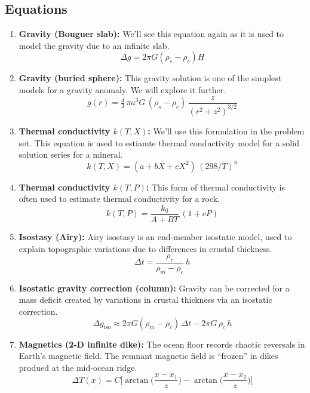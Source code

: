 \documentclass[11pt,a4paper]{article}
\begin{document}
\subsection*{Equations}
\begin{enumerate}[label=Q\arabic*.,itemsep=6pt]
  \item \textbf{Gravity (Bouguer slab):}
  We'll see this equation again as it is used to model the gravity due to an infinite slab.
  \[
    \Delta g = 2\pi G(\rho_s - \rho_c)H
  \]
  \answerbox[2cm]

  \item \textbf{Gravity (buried sphere):} 
  This gravity solution is one of the simplest models for a gravity anomaly.  We will explore it further.
  \[
    g(r) = \tfrac{4}{3}\, \pi a^3 G\, (\rho_s - \rho_c) \, \dfrac{z}{(r^2+z^2)^{3/2}}
  \]
  \answerbox[2cm]

  \item \textbf{Thermal conductivity $k(T,X)$:} 
  We'll use this formulation in the problem set.  This equation is used  to estiamte thermal conductivity model for a solid solution series for a mineral.
  \[
    k(T,X) = (a + bX + cX^2)\,(298/T)^n
  \]
  \answerbox[2cm]

  \item \textbf{Thermal conductivity $k(T,P)$:} 
  This form of thermal conductivity is often used to estimate thermal conductivity for a rock.
  \[
    k(T,P) = \dfrac{k_0}{A + BT}\,(1 + cP)
  \]
  \answerbox[2cm]

  \item \textbf{Isostasy (Airy):}
  Airy isostasy is an end-member isostatic model, used to explain topographic variations due to differences in crustal thickness.
  \[
    \Delta t = \dfrac{\rho_c}{\rho_m - \rho_c}\,h
  \]
  \answerbox[2cm]

  \item \textbf{Isostatic gravity correction (column):} 
  Gravity can be corrected for a mass deficit created by variations in crustal thickness via an isostatic correction.
  \[
    \Delta g_{\mathrm{iso}} \approx 2\pi G(\rho_m-\rho_c)\,\Delta t - 2\pi G\,\rho_c\,h
  \]
  \answerbox[2cm]

  \item \textbf{Magnetics (2-D infinite dike):}
  The ocean floor records chaotic reversals in Earth's magnetic field.  The remnant magnetic field is ``frozen'' in dikes produed at the mid-ocean ridge.
  \[
    \Delta T(x) = C\Big[\arctan\Big(\frac{x-x_1}{z}\Big) - \arctan\Big(\frac{x-x_2}{z}\Big)\Big]
  \]
  \answerbox[2cm]


\end{enumerate}
\end{document}
